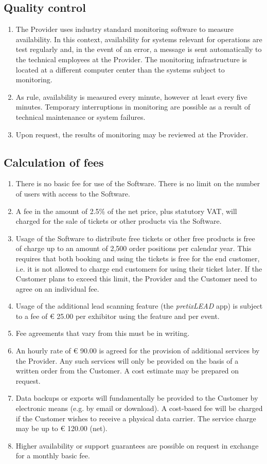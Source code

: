 \documentclass{terms}
\begin{document}
\subsection{Quality control}
\begin{enumerate}
\item The Provider uses industry standard monitoring software to measure availability. In this context, availability for systems relevant for operations are test regularly and, in the event of an error, a message is sent automatically to the technical employees at the Provider. The monitoring infrastructure is located at a different computer center than the systems subject to monitoring.
\item As rule, availability is measured every minute, however at least every five minutes. Temporary interruptions in monitoring are possible as a result of technical maintenance or system failures.
\item Upon request, the results of monitoring may be reviewed at the Provider.
\end{enumerate}

\subsection{Calculation of fees}
\label{entgelt}
\begin{enumerate}
\item There is no basic fee for use of the Software. There is no limit on the number of users with access to the Software.
\item A fee in the amount of 2.5\% of the net price, plus statutory VAT, will charged for the sale of tickets or other products via the Software.
\item Usage of the Software to distribute free tickets or other free products is free of charge up to an amount of 2,500 order positions per calendar year. This requires that both booking and using the tickets is free for the end customer, i.e. it is not allowed to charge end customers for using their ticket later. If the Customer plans to exceed this limit, the Provider and the Customer need to agree on an individual fee.
\item Usage of the additional lead scanning feature (the \emph{pretixLEAD} app) is subject to a fee of € 25.00 per exhibitor using the feature and per event.
\item Fee agreements that vary from this must be in writing.
\item An hourly rate of € 90.00 is agreed for the provision of additional services by the Provider. Any such services will only be provided on the basis of a written order from the Customer. A cost estimate may be prepared on request.
\item Data backups or exports will fundamentally be provided to the Customer by electronic means (e.g. by email or download). A cost-based fee will be charged if the Customer wishes to receive a physical data carrier. The service charge may be up to € 120.00 (net).
\item Higher availability or support guarantees are possible on request in exchange for a monthly basic fee.
\end{enumerate}
\end{document}
